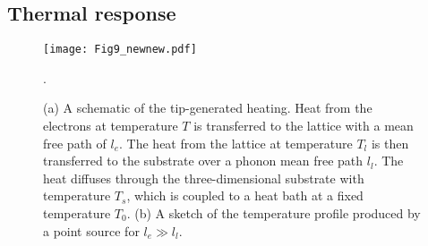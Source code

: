 \documentclass[aps, prb, reprint, superscriptaddress]{revtex4-2}
\begin{document}
\subsection{Thermal response}
\label{ssec:TR}
\begin{figure}[h]
	\texttt{[image: Fig9\_newnew.pdf]}
	\caption{(a) A schematic of the tip-generated heating. 
	Heat from the electrons at temperature $T$ is transferred to the lattice with a mean free path of $l_e$.
	The heat from the lattice at temperature $T_l$ is then transferred to the substrate over a phonon mean free path $l_l$. 
	The heat diffuses through the three-dimensional substrate with temperature $T_s$, which is coupled to a heat bath at a fixed temperature $T_0$. 
	(b) A sketch of the temperature profile produced by a point source for $l_e\gg l_l$.}
	\label{Fig:Appendix_schematic}. 
\end{figure}
\end{document}
